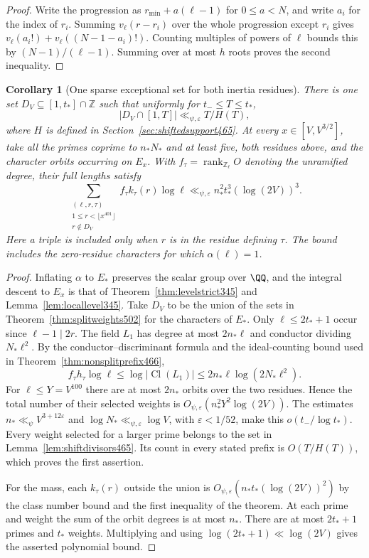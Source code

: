 \documentclass[a4paper,11pt]{article}
\newtheorem{corollary}[proposition]{Corollary}
\theoremstyle{definition}
\theoremstyle{remark}
\newcommand{\ZZ}{\mathbb Z}\newcommand{\ord}{\operatorname{ord}}
\numberwithin{equation}{section}
\newcommand{\Cl}{\operatorname{Cl}}
\begin{document}
\begin{proof}
Write the progression as \(r_{\min}+a(\ell-1)\)
for \(0\le a<N\), and write \(a_i\) for the index of \(r_i\).
Summing \(v_\ell(r-r_i)\) over the whole progression except
\(r_i\) gives \(v_\ell(a_i!)+v_\ell((N-1-a_i)!)\).
Counting multiples of powers of \(\ell\) bounds this by
\((N-1)/(\ell-1)\). Summing over at most \(h\) roots proves the
second inequality.
\end{proof}

\begin{corollary}[One sparse exceptional set for both inertia residues]\leavevmode
\label{cor:fullcollision502}
There is one set \(D_V\subseteq[1,t_*]\cap\ZZ\) such that
uniformly for \(t_-\le T\le t_*\),
\[
 |D_V\cap[1,T]|\ll_{\psi,\varepsilon} T/H(T),
\]
where \(H\) is defined in Section~\ref{sec:shiftedsupport465}.
At every \(x\in[V,V^{3/2}]\), take all the primes coprime
to \(n_*N_*\) and at least five, both residues above, and the
character orbits occurring on \(E_x\). With \(f_\tau=\operatorname{rank}_{\ZZ_\ell}O\)
denoting the unramified degree, their full lengths satisfy
\[
 \sum_{\substack{(\ell,r,\tau)\\1\le r<\lfloor x^{401}\rfloor\\
                              r\notin D_V}}
       f_\tau k_\tau(r)\log\ell
       \ll_{\psi,\varepsilon} n_*^2 t_*^3(\log(2V))^3 .
\]
Here a triple is included only when \(r\) is in the residue
defining \(\tau\). The bound includes the zero-residue characters
for which \(\alpha(\ell)=1\).
\end{corollary}
\begin{proof}
Inflating \(\alpha\) to \(E_*\) preserves the scalar group over
\(\QQ\), and the integral descent to \(E_x\) is that of
Theorem~\ref{thm:levelstrict345} and Lemma~\ref{lem:locallevel345}.
Take \(D_V\) to be the union of the sets in
Theorem~\ref{thm:splitweights502} for the characters of \(E_*\).
Only \(\ell\le2t_*+1\) occur since \(\ell-1\mid 2r\).
The field \(L_1\) has degree at most \(2n_*\ell\) and conductor
dividing \(N_*\ell^2\). By the conductor--discriminant formula
and the ideal-counting bound used in
Theorem~\ref{thm:nonsplitprefix466},
\[
 f_\tau h_\tau\log\ell\le \log|\Cl(L_1)|
                  \le 2n_*\ell\log(2N_*\ell^2).
\]
For \(\ell\le Y=V^{100}\) there are at most \(2n_*\) orbits
over the two residues. Hence the total number of their selected
weights is \(O_{\psi,\varepsilon}(n_*^2Y^2\log(2V))\).
The estimates \(n_*\ll_\psi V^{3+12\varepsilon}\) and
\(\log N_*\ll_{\psi,\varepsilon}\log V\), with
\(\varepsilon<1/52\), make this \(o(t_-/\log t_*)\).
Every weight selected for a larger prime belongs to the set in
Lemma~\ref{lem:shiftdivisors465}. Its count in every stated
prefix is \(O(T/H(T))\), which proves the first assertion.

For the mass, each \(k_\tau(r)\) outside the union is
\(O_{\psi,\varepsilon}(n_*t_*(\log(2V))^2)\) by the class number
bound and the first inequality of the theorem. At each prime
and weight the sum of the orbit degrees is at most \(n_*\).
There are at most \(2t_*+1\) primes and \(t_*\) weights.
Multiplying and using \(\log(2t_*+1)\ll\log(2V)\) gives
the asserted polynomial bound.
\end{proof}
\end{document}

